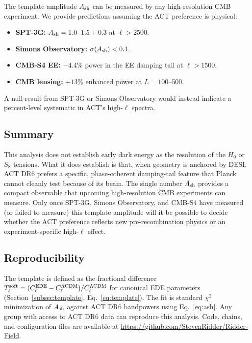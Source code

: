 \documentclass[twocolumn,showpacs,preprintnumbers,amsmath,amssymb,prd]{revtex4-2}
\begin{document}
The template amplitude $A_{\rm sh}$ can be measured by any high-resolution 
CMB experiment. We provide predictions assuming the ACT preference is physical:
\begin{itemize}
\item \textbf{SPT-3G:} $A_{\rm sh} = 1.0$--$1.5 \pm 0.3$ at $\ell > 2500$.
\item \textbf{Simons Observatory:} $\sigma(A_{\rm sh}) < 0.1$.
\item \textbf{CMB-S4 EE:} $-4.4\%$ power in the EE damping tail at $\ell > 1500$.
\item \textbf{CMB lensing:} $+13\%$ enhanced power at $L = 100$--500.
\end{itemize}

A null result from SPT-3G or Simons Observatory would instead indicate 
a percent-level systematic in ACT's high-$\ell$ spectra.

\subsection{Summary}

This analysis does not establish early dark energy as the resolution of the 
$H_0$ or $S_8$ tensions. What it does establish is that, when geometry is 
anchored by DESI, ACT DR6 prefers a specific, phase-coherent damping-tail 
feature that Planck cannot cleanly test because of its beam. The single 
number $A_{\rm sh}$ provides a compact observable that upcoming high-resolution 
CMB experiments can measure. Only once SPT-3G, Simons Observatory, and CMB-S4 
have measured (or failed to measure) this template amplitude will it be 
possible to decide whether the ACT preference reflects new pre-recombination 
physics or an experiment-specific high-$\ell$ effect.

\subsection{Reproducibility}

The template is defined as the fractional difference 
$T_\ell^{\rm soft} = (C_\ell^{\rm EDE} - C_\ell^{\rm \Lambda CDM})/C_\ell^{\rm \Lambda CDM}$ 
for canonical EDE parameters (Section~\ref{subsec:template}, Eq.~\ref{eq:template}). 
The fit is standard $\chi^2$ minimization of $A_{\rm sh}$ against ACT DR6 bandpowers 
using Eq.~\ref{eq:ash}. 
Any group with access to ACT DR6 data can reproduce this analysis. Code, 
chains, and configuration files are available at 
\url{https://github.com/StevenRidder/Ridder-Field}.
\end{document}
